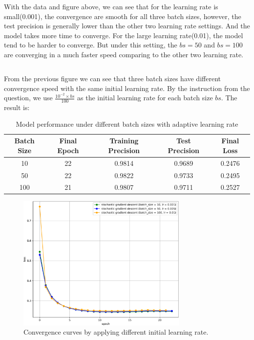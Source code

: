 \documentclass{article}
\begin{document}
With the data and figure above, we can see that for the learning rate is small(0.001), the convergence are smooth for all three batch sizes, however, the test precision is generally lower than the other two learning rate settings. And the model takes more time to converge. For the large learning rate(0.01), the model tend to be harder to converge. But under this setting, the $ bs=50 $ and $ bs=100 $ are converging in a much faster speed comparing to the other two learning rate.
\clearpage
\subsection{}
From the previous figure we can see that three batch sizes have different convergence speed with the same initial learning rate. By the instruction from the question, we use $ \frac{10^{-2} \times bs}{100}  $ as the initial learning rate for each batch size $ bs $. The result is:\\ 
\begin{table}[ht]
\centering
\begin{tabular}{|c|c|c|c|c|}
\hline
\textbf{Batch Size} & \textbf{Final Epoch} & \textbf{Training Precision} & \textbf{Test Precision} & \textbf{Final Loss} \\
\hline
10  & 22 & 0.9814 & 0.9689 & 0.2476 \\
50  & 22 & 0.9822 & 0.9733 & 0.2495 \\
100 & 21 & 0.9807 & 0.9711 & 0.2527 \\
\hline
\end{tabular}
\caption{Model performance under different batch sizes with adaptive learning rate}
\label{tab:batch_adaptive}
\end{table}
\begin{figure}[htpb]
    \begin{center}
        \includegraphics[width=0.75\textwidth]{./figures/logistic_regression_loss_sgd_dynamic.pdf}
    \end{center}
    \caption{Convergence curves by applying different initial learning rate.}\label{fig:}
\end{figure}\\
\end{document}
